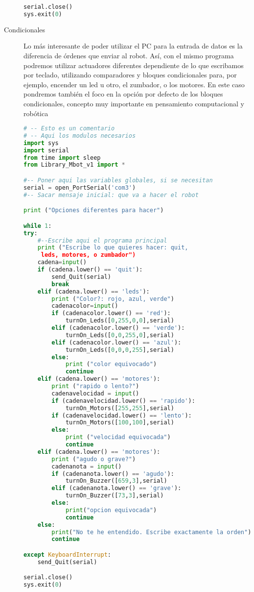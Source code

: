 \begin{description}
\begin{lstlisting}[language=python,caption={Solución del ejercicio de LEDS y sensor de Distancia en Python}]
serial.close()
sys.exit(0)
\end{lstlisting}
	\item [Condicionales] Lo más interesante de poder utilizar el PC para la entrada de datos es la diferencia de órdenes que enviar al robot. Así, con el mismo programa podremos utilizar actuadores diferentes dependiente de lo que escribamos por teclado, utilizando comparadores y bloques condicionales para, por ejemplo, encender un led u otro, el zumbador, o los motores. En este caso pondremos también el foco en la opción por defecto de los bloques condicionales, concepto muy importante en pensamiento computacional y robótica
\begin{lstlisting}[language=python,caption={Solución de referencia del ejercicio sobre condicionales}]
# -- Esto es un comentario		
# -- Aqui los modulos necesarios
import sys
import serial
from time import sleep
from Library_Mbot_v1 import *

#-- Poner aqui las variables globales, si se necesitan
serial = open_PortSerial('com3')
#-- Sacar mensaje inicial: que va a hacer el robot

print ("Opciones diferentes para hacer")

while 1:
try:
	#--Escribe aqui el programa principal
	print ("Escribe lo que quieres hacer: quit,
	 leds, motores, o zumbador")
	cadena=input()
	if (cadena.lower() == 'quit'):
		send_Quit(serial)
		break
	elif (cadena.lower() == 'leds'):
		print ("Color?: rojo, azul, verde")
		cadenacolor=input()
		if (cadenacolor.lower() == 'red'):
			turnOn_Leds([0,255,0,0],serial)
		elif (cadenacolor.lower() == 'verde'):
			turnOn_Leds([0,0,255,0],serial)
		elif (cadenacolor.lower() == 'azul'):
			turnOn_Leds([0,0,0,255],serial)
		else:
			print ("color equivocado")
			continue
	elif (cadena.lower() == 'motores'):
		print ("rapido o lento?")
		cadenavelocidad = input()
		if (cadenavelocidad.lower() == 'rapido'):
			turnOn_Motors([255,255],serial)
		if (cadenavelocidad.lower() == 'lento'):
			turnOn_Motors([100,100],serial)
		else:
			print ("velocidad equivocada")
			continue
	elif (cadena.lower() == 'motores'):
		print ("agudo o grave?")
		cadenanota = input()
		if (cadenanota.lower() == 'agudo'):
			turnOn_Buzzer([659,3],serial)
		elif (cadenanota.lower() == 'grave'):
			turnOn_Buzzer([73,3],serial)
		else:
			print("opcion equivocada")
			continue
	else:
		print("No te he entendido. Escribe exactamente la orden")
		continue

except KeyboardInterrupt:
	send_Quit(serial)

serial.close()
sys.exit(0)
\end{lstlisting}
\end{description}